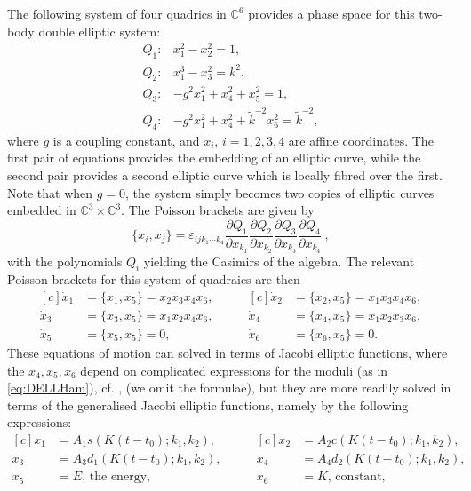 \documentclass[fleqn,11pt,twoside]{article}
\theoremstyle{definition}
\begin{document}
The following system of four quadrics in $\mathbb{C}^6$ provides a phase space for this two-body double elliptic system:
\begin{equation}
\begin{array}{lc}
Q_1: & x_1^2-x_2^2=1,\\
Q_2: & x_1^3-x_3^2=k^2,\\
Q_3: & -g^2x_1^2+x_4^2+x_5^2=1,\\
Q_4: & -g^2x_1^2+x_4^2+\widetilde{k}^{-2}x_6^2=\widetilde{k}^{-2},
\end{array}
\end{equation}
where $g$ is a coupling constant, and $x_i$, $i=1,2,3,4$ are affine coordinates. 
The first pair of equations provides the embedding of an elliptic curve, while the second pair 
provides a second elliptic curve which is locally fibred over the first. 
Note that when $g=0$, the system simply becomes two copies of elliptic curves embedded in $\mathbb{C}^3\times\mathbb{C}^3$. The Poisson brackets are given by 
\begin{equation}\label{eq:PBs} 
\{ x_i,x_j\} =\varepsilon_{ijk_1\cdots k_4}\frac{\partial Q_1}{\partial x_{k_1}}\frac{\partial Q_2}{\partial x_{k_2}}
\frac{\partial Q_3}{\partial x_{k_3}}\frac{\partial Q_4}{\partial x_{k_4}}\ , 
\end{equation}
with the polynomials $Q_i$ yielding the Casimirs of the algebra. The relevant Poisson brackets for this system of quadraics are then\cite{braden2}
\begin{equation}
\begin{aligned}[c]
\dot{x}_1&=\{x_1,x_5\}=x_2x_3x_4x_6,\\
\dot{x}_3&=\{x_3,x_5\}=x_1x_2x_4x_6,\\
\dot{x}_5&=\{x_5,x_5\}=0,
\end{aligned}
\qquad
\begin{aligned}[c]
\dot{x}_2&=\{x_2,x_5\}=x_1x_3x_4x_6,\\
\dot{x}_4&=\{x_4,x_5\}=x_1x_2x_3x_6,\\
\dot{x}_6&=\{x_6,x_5\}=0.
\end{aligned}
\end{equation}
These equations of motion can solved in terms of Jacobi elliptic functions, where the $x_4,x_5,x_6$ depend on 
complicated expressions for the moduli (as in \eqref{eq:DELLHam}), cf. \cite{braden2}, (we omit the formulae), 
but they are more readily solved in terms of the generalised Jacobi elliptic functions, namely by the following 
expressions: 
\begin{equation}
\begin{aligned}[c]
x_1&=A_1 s(K(t-t_0);k_1,k_2),\\
x_3&=A_3d_1(K(t-t_0);k_1,k_2),\\
x_5&=E,\,\mathrm{the\,\, energy},
\end{aligned}
\qquad
\begin{aligned}[c]
x_2&=A_2 c(K(t-t_0);k_1,k_2),\\
x_4&=A_4 d_2(K(t-t_0);k_1,k_2),\\
x_6&=K,\,\mathrm{constant},
\end{aligned}
\end{equation}
\end{document}
